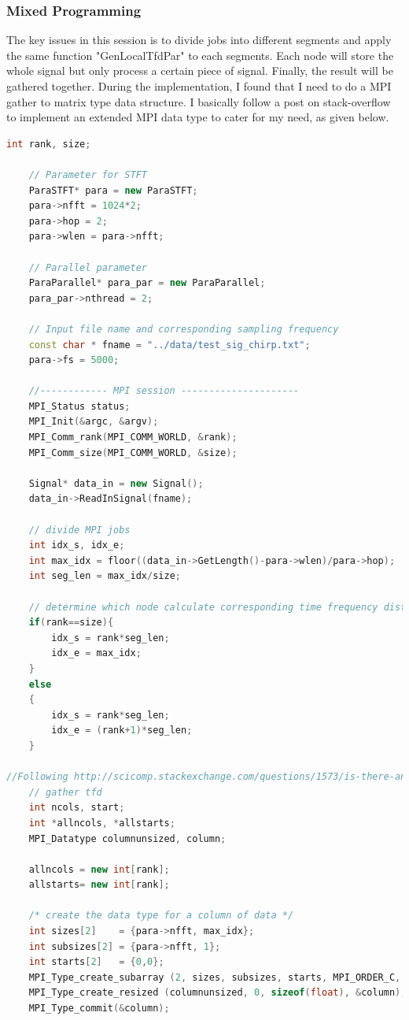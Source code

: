 \documentclass[11pt,letter]{article}
\begin{document}
\subsubsection{Mixed Programming}
The key issues in this session is to divide jobs into different segments and apply the same function "GenLocalTfdPar" to each segments. Each node will store the whole signal but only process a certain piece of signal. Finally, the result will be gathered together. During the implementation, I found that I need to do a MPI gather to matrix type data structure. I basically follow a post on stack-overflow to implement an extended  MPI data type to cater for my need, as given below.

\begin{lstlisting}[language=C++]
	int rank, size;

	// Parameter for STFT
	ParaSTFT* para = new ParaSTFT;
	para->nfft = 1024*2;
	para->hop = 2;
	para->wlen = para->nfft;
	
	// Parallel parameter
	ParaParallel* para_par = new ParaParallel;
	para_par->nthread = 2;
	
	// Input file name and corresponding sampling frequency
	const char * fname = "../data/test_sig_chirp.txt";
	para->fs = 5000;

	//------------ MPI session ---------------------
	MPI_Status status;
	MPI_Init(&argc, &argv);
	MPI_Comm_rank(MPI_COMM_WORLD, &rank);
	MPI_Comm_size(MPI_COMM_WORLD, &size);

	Signal* data_in = new Signal();
	data_in->ReadInSignal(fname);
	
	// divide MPI jobs
	int idx_s, idx_e;
	int max_idx = floor((data_in->GetLength()-para->wlen)/para->hop);
	int seg_len = max_idx/size;

	// determine which node calculate corresponding time frequency distribution
	if(rank==size){
		idx_s = rank*seg_len;
		idx_e = max_idx;
	}
	else
	{
		idx_s = rank*seg_len;
		idx_e = (rank+1)*seg_len;
	}

//Following http://scicomp.stackexchange.com/questions/1573/is-there-an-mpi-all-gather-operation-for-matrices
	// gather tfd
	int ncols, start;
    int *allncols, *allstarts;
    MPI_Datatype columnunsized, column;

    allncols = new int[rank];
    allstarts= new int[rank];

    /* create the data type for a column of data */
    int sizes[2]    = {para->nfft, max_idx};
    int subsizes[2] = {para->nfft, 1};
    int starts[2]   = {0,0};
    MPI_Type_create_subarray (2, sizes, subsizes, starts, MPI_ORDER_C, MPI_FLOAT, &columnunsized);
    MPI_Type_create_resized (columnunsized, 0, sizeof(float), &column);
    MPI_Type_commit(&column);


\end{lstlisting}
\end{document}
